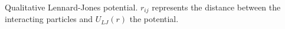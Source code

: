 Qualitative Lennard-Jones potential. $r_{ij}$ represents the distance
between the interacting particles and $U_{LJ}(r)$ the potential.